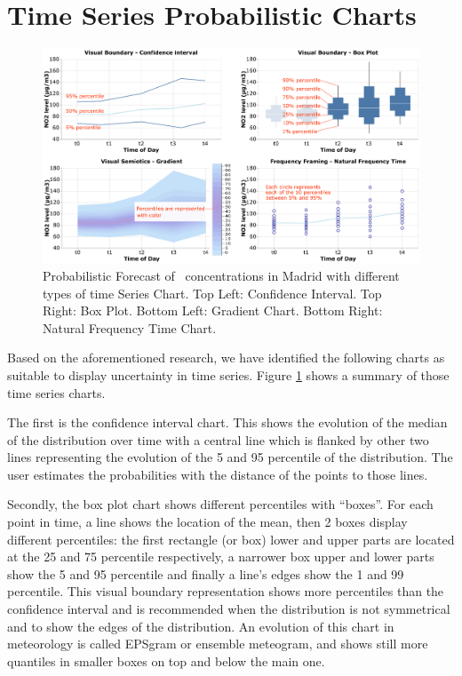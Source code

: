 \documentclass[a4paper,3p,sort&compress]{elsarticle}
\begin{document}
\section{Time Series Probabilistic Charts}
\label{sec:time_series}

\begin{figure}
  \centering
  \includegraphics[width=.9\textwidth]{charts_vector}
  \caption{\label{figure:charts} Probabilistic Forecast of \no~concentrations in Madrid
    with different types of time Series Chart. Top Left: Confidence Interval.
    Top Right: Box Plot. Bottom Left: Gradient Chart. Bottom Right: Natural
    Frequency Time Chart.}
\end{figure}

Based on the aforementioned research, we have identified the following charts as
suitable to display uncertainty in time series. Figure \ref{figure:charts} shows
a summary of those time series charts.

The first is the confidence interval chart. This shows the evolution of the
median of the distribution over time with a central line which is flanked by
other two lines representing the evolution of the 5 and 95
percentile of the distribution. The user estimates the probabilities with the
distance of the points to those lines.

Secondly, the box plot chart shows different percentiles with “boxes”. For each
point in time, a line shows the location of the mean, then 2 boxes display
different percentiles: the first rectangle (or box) lower and upper parts are
located at the 25 and 75 percentile respectively, a narrower box
upper and lower parts show the 5 and 95 percentile and finally a
line’s edges show the 1 and 99 percentile. This visual boundary
representation shows more percentiles than the confidence interval and is
recommended when the distribution is not symmetrical and to show the edges of
the distribution. An evolution of this chart in meteorology is called EPSgram or
ensemble meteogram, and shows still more quantiles in smaller boxes on top and
below the main one.
\end{document}
